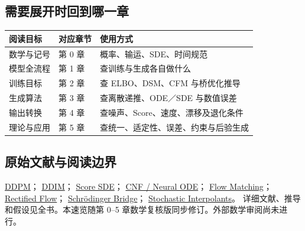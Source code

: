 \documentclass[language=chinese,margin=right,11pt]{lumenbook}
\begin{document}
\subsection*{需要展开时回到哪一章}
\par\noindent
\begin{tabularx}{\textwidth}{@{}llX@{}}
\toprule
阅读目标 & 对应章节 & 使用方式 \\
\midrule
数学与记号 & 第 0 章 & 概率、输运、SDE、时间规范 \\
模型全流程 & 第 1 章 & 查训练与生成各自做什么 \\
训练目标 & 第 2 章 & 查 ELBO、DSM、CFM 与桥优化推导 \\
生成算法 & 第 3 章 & 查离散递推、ODE／SDE 与数值误差 \\
输出转换 & 第 4 章 & 查噪声、Score、速度、漂移及退化条件 \\
理论与应用 & 第 5 章 & 查统一、适定性、误差、约束与后验生成 \\
\bottomrule
\end{tabularx}

\subsection*{原始文献与阅读边界}
{\small
\href{https://arxiv.org/abs/2006.11239}{DDPM}；
\href{https://arxiv.org/abs/2010.02502}{DDIM}；
\href{https://arxiv.org/abs/2011.13456}{Score SDE}；
\href{https://arxiv.org/abs/1806.07366}{CNF / Neural ODE}；
\href{https://arxiv.org/abs/2210.02747}{Flow Matching}；
\href{https://arxiv.org/abs/2209.03003}{Rectified Flow}；
\href{https://arxiv.org/abs/1308.0215}{Schrödinger Bridge}；
\href{https://jmlr.org/papers/v26/23-1605.html}{Stochastic Interpolants}。
详细文献、推导和假设见全书。本速览随第 0--5 章数学复核版同步修订。外部数学审阅尚未进行。}
\end{document}
